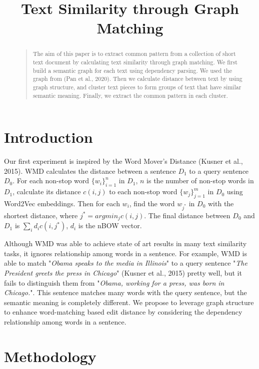 \documentclass[letterpaper]{article}
\begin{document}
 \newcommand\upquote[1]{\textquotesingle#1\textquotesingle}

\title{Text Similarity through Graph Matching}
\author{
}
\maketitle
\begin{abstract}
\begin{quote}
The aim of this paper is to extract common pattern from a collection of short text document by calculating  text similarity through graph matching. We first build a semantic graph for each text using dependency parsing. We used the graph from (Pan et al., 2020). Then we calculate distance between text by using graph structure, and cluster text pieces to form groups of text that have similar semantic meaning. Finally, we extract the common pattern in each cluster.
\end{quote}
\end{abstract}

\section{Introduction}
Our first experiment is inspired by the Word Mover's Distance (Kusner et al., 2015). WMD calculates the distance between a sentence $D_1$ to a query sentence $D_0$. For each non-stop word $\{w_i\}_{i=1}^{n}$ in $D_1$, $n$ is the number of non-stop words in $D_1$, calculate its distance $c(i, j)$ to each non-stop word $\{w_j\}_{j=1}^{m}$ in $D_0$ using Word2Vec embeddings. Then for each $w_i$, find the word $w_{j^*}$ in $D_0$ with the shortest distance, where $j^* = argmin_j c(i,j)$. The final distance between $D_0$ and $D_1$ is $\sum_i d_ic(i, j^*)$, $d_i$ is the nBOW vector.

Although WMD was able to achieve state of art results in many text similarity tasks, it ignores relationship among words in a sentence. For example, WMD is able to match "\textit{Obama speaks to the media in Illinois}" to a query sentence "\textit{The President greets the press in Chicago}" (Kusner et al., 2015) pretty well, but it fails to distinguish them from "\textit{Obama, working for a press, was born in Chicago.}". This sentence matches many words with the query sentence, but the semantic meaning is completely different. We propose to leverage graph structure to enhance word-matching based edit distance by considering the dependency relationship among words in a sentence.

\section{Methodology}
\end{document}
